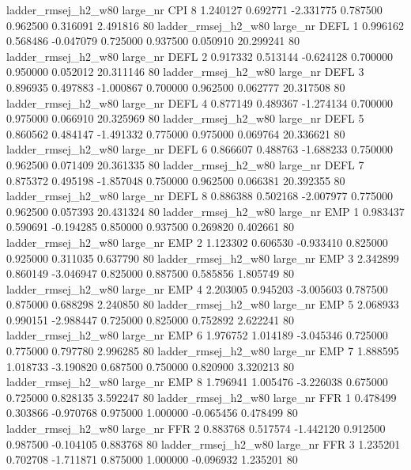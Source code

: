 ladder_rmsej_h2_w80   large_nr      CPI                 8  1.240127  0.692771  -2.331775 0.787500 0.962500  0.316091    2.491816 80
ladder_rmsej_h2_w80   large_nr     DEFL                 1  0.996162  0.568486  -0.047079 0.725000 0.937500  0.050910   20.299241 80
ladder_rmsej_h2_w80   large_nr     DEFL                 2  0.917332  0.513144  -0.624128 0.700000 0.950000  0.052012   20.311146 80
ladder_rmsej_h2_w80   large_nr     DEFL                 3  0.896935  0.497883  -1.000867 0.700000 0.962500  0.062777   20.317508 80
ladder_rmsej_h2_w80   large_nr     DEFL                 4  0.877149  0.489367  -1.274134 0.700000 0.975000  0.066910   20.325969 80
ladder_rmsej_h2_w80   large_nr     DEFL                 5  0.860562  0.484147  -1.491332 0.775000 0.975000  0.069764   20.336621 80
ladder_rmsej_h2_w80   large_nr     DEFL                 6  0.866607  0.488763  -1.688233 0.750000 0.962500  0.071409   20.361335 80
ladder_rmsej_h2_w80   large_nr     DEFL                 7  0.875372  0.495198  -1.857048 0.750000 0.962500  0.066381   20.392355 80
ladder_rmsej_h2_w80   large_nr     DEFL                 8  0.886388  0.502168  -2.007977 0.775000 0.962500  0.057393   20.431324 80
ladder_rmsej_h2_w80   large_nr      EMP                 1  0.983437  0.590691  -0.194285 0.850000 0.937500  0.269820    0.402661 80
ladder_rmsej_h2_w80   large_nr      EMP                 2  1.123302  0.606530  -0.933410 0.825000 0.925000  0.311035    0.637790 80
ladder_rmsej_h2_w80   large_nr      EMP                 3  2.342899  0.860149  -3.046947 0.825000 0.887500  0.585856    1.805749 80
ladder_rmsej_h2_w80   large_nr      EMP                 4  2.203005  0.945203  -3.005603 0.787500 0.875000  0.688298    2.240850 80
ladder_rmsej_h2_w80   large_nr      EMP                 5  2.068933  0.990151  -2.988447 0.725000 0.825000  0.752892    2.622241 80
ladder_rmsej_h2_w80   large_nr      EMP                 6  1.976752  1.014189  -3.045346 0.725000 0.775000  0.797780    2.996285 80
ladder_rmsej_h2_w80   large_nr      EMP                 7  1.888595  1.018733  -3.190820 0.687500 0.750000  0.820900    3.320213 80
ladder_rmsej_h2_w80   large_nr      EMP                 8  1.796941  1.005476  -3.226038 0.675000 0.725000  0.828135    3.592247 80
ladder_rmsej_h2_w80   large_nr      FFR                 1  0.478499  0.303866  -0.970768 0.975000 1.000000 -0.065456    0.478499 80
ladder_rmsej_h2_w80   large_nr      FFR                 2  0.883768  0.517574  -1.442120 0.912500 0.987500 -0.104105    0.883768 80
ladder_rmsej_h2_w80   large_nr      FFR                 3  1.235201  0.702708  -1.711871 0.875000 1.000000 -0.096932    1.235201 80
